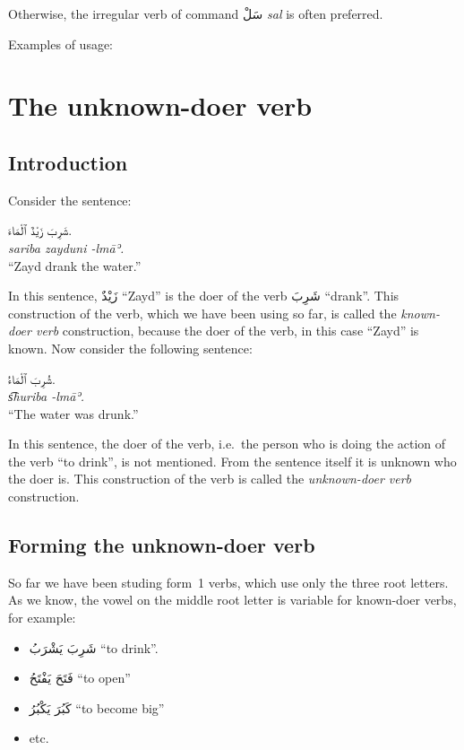 \documentclass[
  10pt,
]{book}
\providecommand{\tightlist}{%
  \setlength{\itemsep}{0pt}\setlength{\parskip}{0pt}}
\begin{document}
Otherwise, the irregular verb of command
\foreignlanguage{arabic}{سَلْ} \emph{sal} is often preferred.

Examples of usage:

\chapter{The unknown-doer verb}\label{the-unknown-doer-verb}

\section{Introduction}\label{introduction-20}

Consider the sentence:

\foreignlanguage{arabic}{شَرِبَ زَيْدٌ ٱلْمَاءَ.}\\
\emph{sariba zayduni -lmāʾ.}\\
\enquote{Zayd drank the water.}

In this sentence, \foreignlanguage{arabic}{زَيْدٌ} \enquote{Zayd} is the doer of the verb \foreignlanguage{arabic}{شَرِبَ} \enquote{drank}.
This construction of the verb, which we have been using so far, is called the \emph{known-doer verb} construction,
because the doer of the verb, in this case \enquote{Zayd} is known.
Now consider the following sentence:

\foreignlanguage{arabic}{شُرِبَ ٱلْمَاءُ.}\\
\emph{s͡huriba -lmāʾ.}\\
\enquote{The water was drunk.}

In this sentence, the doer of the verb, i.e.~the person who is doing the action of the verb \enquote{to drink}, is not mentioned.
From the sentence itself it is unknown who the doer is.
This construction of the verb is called the \emph{unknown-doer verb} construction.

\section{Forming the unknown-doer verb}\label{forming-the-unknown-doer-verb}

So far we have been studing form~1 verbs, which use only the three root letters.
As we know, the vowel on the middle root letter is variable for known-doer verbs, for example:

\begin{itemize}
\tightlist
\item
  \foreignlanguage{arabic}{شَرِبَ يَشْرَبُ} \enquote{to drink}.
\item
  \foreignlanguage{arabic}{فَتَحَ يَفْتَحُ} \enquote{to open}
\item
  \foreignlanguage{arabic}{کَبُرَ يَکْبُرُ} \enquote{to become big}
\item
  etc.
\end{itemize}
\end{document}
